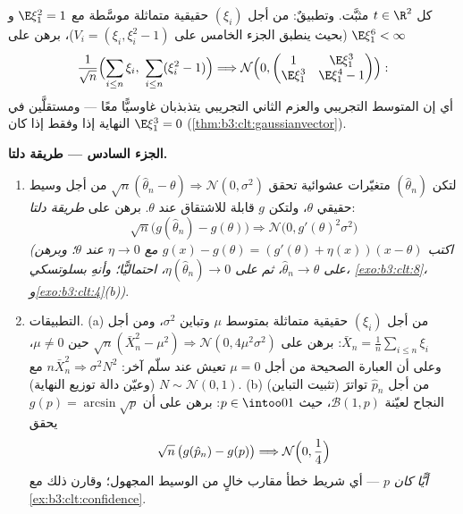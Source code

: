 \begin{problem}
\begin{enumerate}[resume]
        كل $t \in \R^2$ مثبَّت. وتطبيقٌ: من أجل $(\xi_i)$
        حقيقية  متماثلة موسَّطة مع $\E\xi_1^2 = 1$
        و $\E\xi_1^6 < \infty$ (بحيث ينطبق الجزء الخامس على $V_i = (\xi_i, \xi_i^2 - 1)$)، برهن
        على
        \[
        \frac1{\sqrt n}\Bigl(\sum_{i\leq n}\xi_i,\
        \sum_{i\leq n}(\xi_i^2 - 1)\Bigr) \Longrightarrow
        \mathcal N\Bigl(0, \begin{pmatrix} 1 & \E\xi_1^3\\
        \E\xi_1^3 & \E\xi_1^4 - 1\end{pmatrix}\Bigr) :
        \]
        أي إن المتوسط التجريبي والعزم الثاني التجريبي يتذبذبان
        غاوسيًّا معًا --- ومستقلَّين في النهاية إذا وفقط إذا
        كان $\E\xi_1^3 = 0$ (\cref{thm:b3:clt:gaussianvector}).
\end{enumerate}

\medskip
\noindent\textbf{الجزء السادس --- طريقة دلتا.}
\begin{enumerate}[resume]
  \item لتكن $(\hat\theta_n)$ متغيّرات عشوائية تحقق $\sqrt n(\hat\theta_n - \theta) \Rightarrow
        \mathcal N(0, \sigma^2)$ من
        أجل وسيط حقيقي $\theta$، ولتكن $g$ قابلة للاشتقاق عند
        $\theta$. برهن على \emph{طريقة دلتا}:
        \[
        \sqrt n\bigl(g(\hat\theta_n) - g(\theta)\bigr)
        \Longrightarrow \mathcal N\bigl(0,
        g'(\theta)^2\sigma^2\bigr)
        \]
        \emph{(اكتب $g(x) - g(\theta) = (g'(\theta) +
        \eta(x))(x - \theta)$ مع $\eta \to 0$ عند $\theta$؛
        وبرهن على $\hat\theta_n \to \theta$، ثم على $\eta(\hat\theta_n) \to 0$، احتماليًّا؛ وأنهِ
        بسلوتسكي، \cref{exo:b3:clt:8}، و\cref{exo:b3:clt:4}(b))}.
  \item التطبيقات. (a) من أجل $(\xi_i)$ حقيقية  متماثلة
        بمتوسط $\mu$ وتباين $\sigma^2$، ومن أجل $\bar X_n =
        \frac1n\sum_{i\leq n}\xi_i$: برهن
        على $\sqrt n(\bar
        X_n^2 - \mu^2) \Rightarrow \mathcal N(0,
        4\mu^2\sigma^2)$ حين $\mu \neq 0$، وعلى أن العبارة الصحيحة
        من أجل $\mu = 0$ تعيش عند سلّم آخر: $n\bar X_n^2 \Rightarrow \sigma^2N^2$ مع $N \sim \mathcal N(0,1)$
        (وعيّن دالة توزيع النهاية). (b) (تثبيت التباين) من أجل
        $\hat p_n$ تواترَ النجاح لعيّنة $\mathcal B(1, p)$، حيث
        $p \in \intoo01$: برهن على أن $g(p) = \arcsin\sqrt p$ يحقق
        \[
        \sqrt n\,\bigl(g(\hat p_n) - g(p)\bigr)
        \Longrightarrow \mathcal N\Bigl(0, \frac14\Bigr)
        \]
        \emph{أيًّا كان} $p$ --- أي شريط خطأ مقارب خالٍ من
        الوسيط المجهول؛ وقارن ذلك مع \cref{ex:b3:clt:confidence}.
\end{enumerate}


\end{problem}
